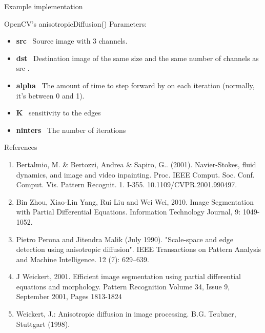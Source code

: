 \documentclass{beamer}
\begin{document}
\begin{frame}{Example implementation}

    \begin{block}{OpenCV's anisotropicDiffusion()}
        Parameters: 
        \begin{itemize}
            \item \textbf{src}\,\,\, Source image with 3 channels. 
            \item \textbf{dst}\,\,\, Destination image of the same size and the same number of channels as src . 
            \item \textbf{alpha}\,\,\, The amount of time to step forward by on each iteration (normally, it's between 0 and 1). 
            \item \textbf{K}\,\,\, sensitivity to the edges 
            \item \textbf{ninters}\,\,\, The number of iterations 
        \end{itemize}
    \end{block}

\end{frame}

\begin{frame}{References}

    \begin{enumerate}
        \item Bertalmio, M. \& Bertozzi, Andrea \& Sapiro, G.. (2001). Navier-Stokes, fluid dynamics, and image and video inpainting. Proc. IEEE Comput. Soc. Conf. Comput. Vis. Pattern Recognit. 1. I-355. 10.1109/CVPR.2001.990497.
        \item Bin Zhou, Xiao-Lin Yang, Rui Liu and Wei Wei, 2010. Image Segmentation with Partial Differential Equations. Information Technology Journal, 9: 1049-1052.
        \item Pietro Perona and Jitendra Malik (July 1990). "Scale-space and edge detection using anisotropic diffusion". IEEE Transactions on Pattern Analysis and Machine Intelligence. 12 (7): 629–639.
        \item J Weickert, 2001. Efficient image segmentation using partial differential equations and morphology. Pattern Recognition Volume 34, Issue 9, September 2001, Pages 1813-1824
        \item Weickert, J.: Anisotropic diffusion in image processing. B.G. Teubner, Stuttgart (1998). 
    \end{enumerate}
\end{frame}
\end{document}
